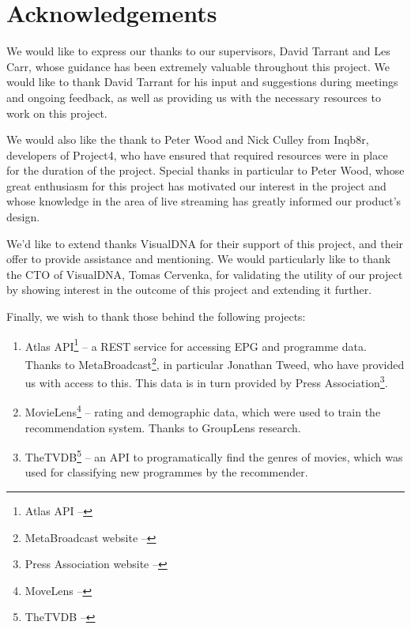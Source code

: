 \section{Acknowledgements}

We would like to express our thanks to our supervisors, David Tarrant and Les Carr, whose guidance has been extremely valuable throughout this project. We would like to thank David Tarrant for his input and suggestions during meetings and ongoing feedback, as well as providing us with the necessary resources to work on this project.

We would also like the thank to Peter Wood and Nick Culley from Inqb8r, developers of Project4, who have ensured that required resources were in place for the duration of the project. Special thanks in particular to Peter Wood, whose great enthusiasm for this project has motivated our interest in the project and whose knowledge in the area of live streaming has greatly informed our product's design.

We'd like to extend thanks VisualDNA for their support of this project, and their offer to provide assistance and mentioning. We would particularly like to thank the CTO of VisualDNA, Tomas Cervenka, for validating the utility of our project by showing interest in the outcome of this project and extending it further.

Finally, we wish to thank those behind the following projects:
\begin{enumerate}
\item Atlas API\footnote{Atlas API -- } -- a REST service for accessing EPG and programme data. Thanks to MetaBroadcast\footnote{MetaBroadcast website -- }, in particular Jonathan Tweed, who have provided us with access to this. This data is in turn provided by Press Association\footnote{Press Association website -- }.
\item MovieLens\footnote{MoveLens -- } -- rating and demographic data, which were used to train the recommendation system. Thanks to GroupLens research.
\item TheTVDB\footnote{TheTVDB -- } -- an API to programatically find the genres of movies, which was used for classifying new programmes by the recommender.
\end{enumerate}

\cleardoublepage
\setcounter{tocdepth}{2}

\begin{comment}
	\tableofcontents
	\newpage
	\cleardoublepage
	\setcounter{page}{0}
	\pagenumbering{arabic}
	\cleardoublepage
\end{comment}

